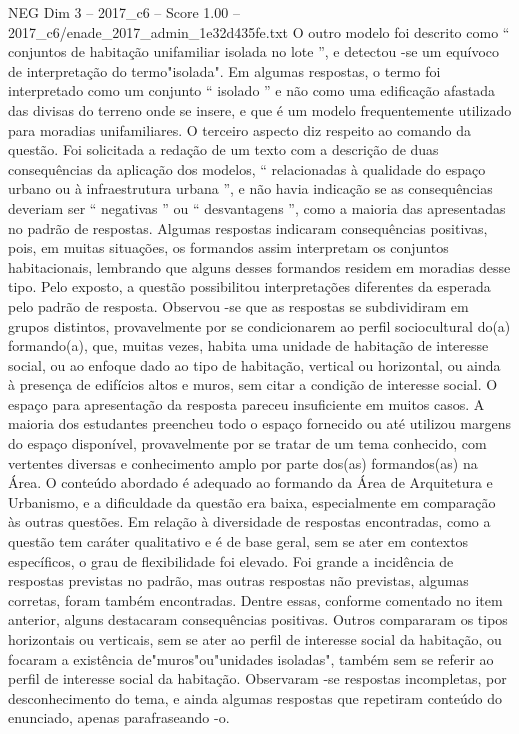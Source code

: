 \begin{textsample}{NEG Dim 3 – 2017\_c6 – Score 1.00 – 2017\_c6/enade\_2017\_admin\_1e32d435fe.txt}
O outro modelo foi descrito como “ conjuntos de habitação unifamiliar isolada no lote ”, e detectou -se um equívoco de interpretação do termo"isolada".
Em algumas respostas, o termo foi interpretado como um conjunto “ isolado ” e não como uma edificação afastada das divisas do terreno onde se insere, e que é um modelo frequentemente utilizado para moradias unifamiliares.
O terceiro aspecto diz respeito ao comando da questão.
Foi solicitada a redação de um texto com a descrição de duas consequências da aplicação dos modelos, “ relacionadas à qualidade do espaço urbano ou à infraestrutura urbana ”, e não havia indicação se as consequências deveriam ser “ negativas ” ou “ desvantagens ”, como a maioria das apresentadas no padrão de respostas.
Algumas respostas indicaram consequências positivas, pois, em muitas situações, os formandos assim interpretam os conjuntos habitacionais, lembrando que alguns desses formandos residem em moradias desse tipo.
Pelo exposto, a questão possibilitou interpretações diferentes da esperada pelo padrão de resposta.
Observou -se que as respostas se subdividiram em grupos distintos, provavelmente por se condicionarem ao perfil sociocultural do(a) formando(a), que, muitas vezes, habita uma unidade de habitação de interesse social, ou ao enfoque dado ao tipo de habitação, vertical ou horizontal, ou ainda à presença de edifícios altos e muros, sem citar a condição de interesse social.
O espaço para apresentação da resposta pareceu insuficiente em muitos casos.
A maioria dos estudantes preencheu todo o espaço fornecido ou até utilizou margens do espaço disponível, provavelmente por se tratar de um tema conhecido, com vertentes diversas e conhecimento amplo por parte dos(as) formandos(as) na Área.
O conteúdo abordado é adequado ao formando da Área de Arquitetura e Urbanismo, e a dificuldade da questão era baixa, especialmente em comparação às outras questões.
Em relação à diversidade de respostas encontradas, como a questão tem caráter qualitativo e é de base geral, sem se ater em contextos específicos, o grau de flexibilidade foi elevado.
Foi grande a incidência de respostas previstas no padrão, mas outras respostas não previstas, algumas corretas, foram também encontradas.
Dentre essas, conforme comentado no item anterior, alguns destacaram consequências positivas.
Outros compararam os tipos horizontais ou verticais, sem se ater ao perfil de interesse social da habitação, ou focaram a existência de"muros"ou"unidades isoladas", também sem se referir ao perfil de interesse social da habitação.
Observaram -se respostas incompletas, por desconhecimento do tema, e ainda algumas respostas que repetiram conteúdo do enunciado, apenas parafraseando -o.

\end{textsample}
